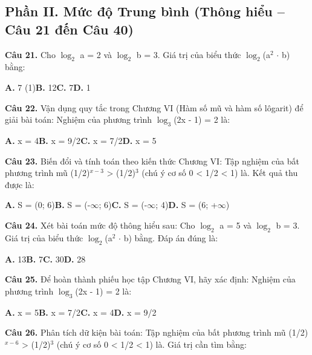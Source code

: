 \documentclass[11pt,a4paper]{article}
\begin{document}
\subsection*{\color{accent} Phần II. Mức độ Trung bình (Thông hiểu -- Câu 21 đến Câu 40)}
\textbf{\color{primary} Câu 21.} Cho $\log_2$ a = 2 và $\log_2$ b = 3. Giá trị của biểu thức $\log_2$(a$^2$ $\cdot$ b) bằng:\par
\hspace*{1.5em}\textbf{A.} 7 (1)\quad\quad \textbf{B.} 12\quad\quad \textbf{C.} 7\quad\quad \textbf{D.} 1\par\vspace{2pt}
\textbf{\color{primary} Câu 22.} Vận dụng quy tắc trong Chương VI (Hàm số mũ và hàm số lôgarit) để giải bài toán: Nghiệm của phương trình $\log_3$(2x - 1) = 2 là:\par
\hspace*{1.5em}\textbf{A.} x = 4\quad\quad \textbf{B.} x = 9/2\quad\quad \textbf{C.} x = 7/2\quad\quad \textbf{D.} x = 5\par\vspace{2pt}
\textbf{\color{primary} Câu 23.} Biến đổi và tính toán theo kiến thức Chương VI: Tập nghiệm của bất phương trình mũ (1/2)$^{x - 3}$ > (1/2)$^3$ (chú ý cơ số 0 < 1/2 < 1) là. Kết quả thu được là:\par
\hspace*{1.5em}\textbf{A.} S = (0; 6)\quad\quad \textbf{B.} S = (-$\infty$; 6)\quad\quad \textbf{C.} S = (-$\infty$; 4)\quad\quad \textbf{D.} S = (6; +$\infty$)\par\vspace{2pt}
\textbf{\color{primary} Câu 24.} Xét bài toán mức độ thông hiểu sau: Cho $\log_2$ a = 5 và $\log_2$ b = 3. Giá trị của biểu thức $\log_2$(a$^2$ $\cdot$ b) bằng. Đáp án đúng là:\par
\hspace*{1.5em}\textbf{A.} 13\quad\quad \textbf{B.} 7\quad\quad \textbf{C.} 30\quad\quad \textbf{D.} 28\par\vspace{2pt}
\textbf{\color{primary} Câu 25.} Để hoàn thành phiếu học tập Chương VI, hãy xác định: Nghiệm của phương trình $\log_3$(2x - 1) = 2 là:\par
\hspace*{1.5em}\textbf{A.} x = 5\quad\quad \textbf{B.} x = 7/2\quad\quad \textbf{C.} x = 4\quad\quad \textbf{D.} x = 9/2\par\vspace{2pt}
\textbf{\color{primary} Câu 26.} Phân tích dữ kiện bài toán: Tập nghiệm của bất phương trình mũ (1/2)$^{x - 6}$ > (1/2)$^3$ (chú ý cơ số 0 < 1/2 < 1) là. Giá trị cần tìm bằng:\par
\end{document}
